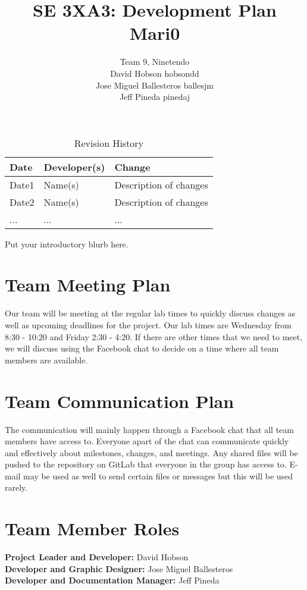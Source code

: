 \documentclass{article}
\title{SE 3XA3: Development Plan\\Mari0}
\author{Team 9, Ninetendo
		\\ David Hobson hobsondd
		\\ Jose Miguel Ballesteros ballesjm
		\\ Jeff Pineda pinedaj
}
\date{}
\begin{document}
\begin{table}[hp]
\caption{Revision History} \label{TblRevisionHistory}
\begin{tabularx}{\textwidth}{llX}
\toprule
\textbf{Date} & \textbf{Developer(s)} & \textbf{Change}\\
\midrule
Date1 & Name(s) & Description of changes\\
Date2 & Name(s) & Description of changes\\
... & ... & ...\\
\bottomrule
\end{tabularx}
\end{table}

\newpage

\maketitle

Put your introductory blurb here.

\section{Team Meeting Plan}
Our team will be meeting at the regular lab times to quickly discuss changes as well as upcoming deadlines for the project. Our lab times are Wednesday from 8:30 - 10:20 and Friday 2:30 - 4:20. If there are other times that we need to meet, we will discuss using the Facebook chat to decide on a time where all team members are available. 

\section{Team Communication Plan}
The communication will mainly happen through a Facebook chat that all team members have access to. Everyone apart of the chat can communicate quickly and effectively about milestones, changes, and meetings. Any shared files will be pushed to the repository on GitLab that everyone in the group has access to. E-mail may be used as well to send certain files or messages but this will be used rarely. 

\section{Team Member Roles}
\textbf{Project Leader and Developer:}  David Hobson\\
\textbf{Developer and Graphic Designer:}  Jose Miguel Ballesteros\\
\textbf{Developer and Documentation Manager:}  Jeff Pineda\\
\end{document}

